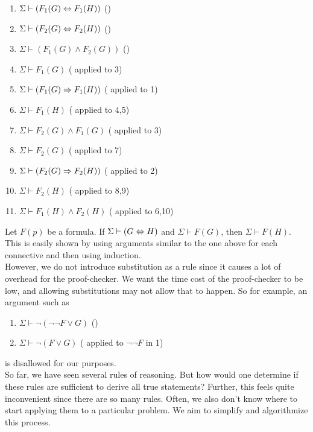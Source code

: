 \begin{enumerate}
    \item $\Sigma\vdash (F_1(G)\Leftrightarrow F_1(H))$ \hfill ()
    \item $\Sigma\vdash (F_2(G)\Leftrightarrow F_2(H))$ \hfill ()
    \item $\Sigma\vdash (F_1(G)\land F_2(G))$ \hfill ()
    \item $\Sigma\vdash F_1(G)$ \hfill ( applied to 3)
    \item $\Sigma\vdash (F_1(G)\Rightarrow F_1(H))$ \hfill ( applied to 1)
    \item $\Sigma\vdash F_1(H)$ \hfill ( applied to 4,5)
    \item $\Sigma\vdash F_2(G)\land F_1(G)$ \hfill ( applied to 3)
    \item $\Sigma\vdash F_2(G)$ \hfill ( applied to 7)
    \item $\Sigma\vdash (F_2(G)\Rightarrow F_2(H))$ \hfill ( applied to 2)
    \item $\Sigma\vdash F_2(H)$ \hfill ( applied to 8,9)
    \item $\Sigma\vdash F_1(H)\land F_2(H)$ \hfill ( applied to 6,10)
\end{enumerate}

Let $F(p)$ be a formula. If $\Sigma\vdash (G\Leftrightarrow H)$ and $\Sigma\vdash F(G)$, then $\Sigma\vdash F(H)$.\\
This is easily shown by using arguments similar to the one above for each connective and then using induction.\\

However, we do not introduce substitution as a rule since it causes a lot of overhead for the proof-checker. We want the time cost of the proof-checker to be low, and allowing substitutions may not allow that to happen. So for example, an argument such as
\begin{enumerate}
    \item $\Sigma\vdash \neg(\neg\neg F\lor G)$ \hfill ()
    \item $\Sigma\vdash \neg(F\lor G)$ \hfill ( applied to $\neg\neg F$ in 1)
\end{enumerate}
is disallowed for our purposes.\\

So far, we have seen several rules of reasoning. But how would one determine if these rules are sufficient to derive all true statements? Further, this feels quite inconvenient since there are so many rules. Often, we also don't know where to start applying them to a particular problem. We aim to simplify and algorithmize this process.